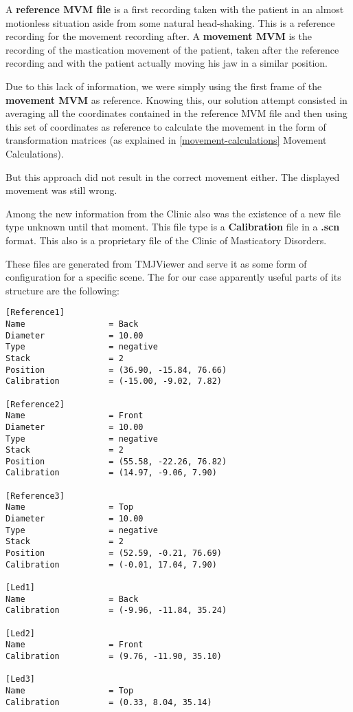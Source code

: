 \noindent A \textbf{reference MVM file} is a first recording taken with the patient in an almost motionless situation aside from some natural head-shaking. This is a reference recording for the movement recording after.
A \textbf{movement MVM} is the recording of the mastication movement of the patient, taken after the reference recording and with the patient actually moving his jaw in a similar position.

Due to this lack of information, we were simply using the first frame of the \textbf{movement MVM} as reference. Knowing this, our solution attempt consisted in averaging all the coordinates contained in the reference MVM file and then using this set of coordinates as reference to calculate the movement in the form of transformation matrices (as explained in \ref{movement-calculations} Movement Calculations).

But this approach did not result in the correct movement either. The displayed movement was still wrong.


Among the new information from the Clinic also was the existence of a new file type unknown until that moment. This file type is a \textbf{Calibration} file in a \textbf{.scn} format. This also is a proprietary file of the Clinic of Masticatory Disorders.

\noindent These files are generated from TMJViewer and serve it as some form of configuration for a specific scene. The for our case apparently useful parts of its structure are the following:

\begin{verbatim}
[Reference1]
Name                 = Back
Diameter             = 10.00
Type                 = negative
Stack                = 2
Position             = (36.90, -15.84, 76.66)
Calibration          = (-15.00, -9.02, 7.82)

[Reference2]
Name                 = Front
Diameter             = 10.00
Type                 = negative
Stack                = 2
Position             = (55.58, -22.26, 76.82)
Calibration          = (14.97, -9.06, 7.90)

[Reference3]
Name                 = Top
Diameter             = 10.00
Type                 = negative
Stack                = 2
Position             = (52.59, -0.21, 76.69)
Calibration          = (-0.01, 17.04, 7.90)

[Led1]
Name                 = Back
Calibration          = (-9.96, -11.84, 35.24)

[Led2]
Name                 = Front
Calibration          = (9.76, -11.90, 35.10)

[Led3]
Name                 = Top
Calibration          = (0.33, 8.04, 35.14)
\end{verbatim}

